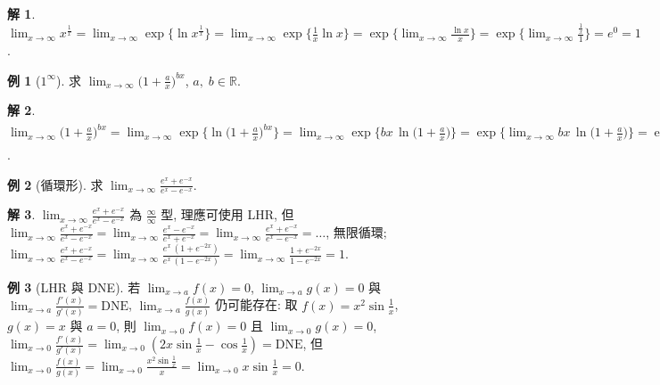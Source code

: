 \documentclass[12pt]{extarticle}
\newcommand{\ds}{\displaystyle}
\theoremstyle{definition}
\newtheorem*{ex}{例}
\newtheorem*{sol}{解}
\begin{document}
\begin{sol}
  $\ds\lim_{x\to\infty} x^{\frac{1}{x}} = \lim_{x\to\infty}\exp\big\{\ln x^{\frac{1}{x}}\big\} = \lim_{x\to\infty}\exp\Big\{\frac{1}{x}\ln x\Big\} = \exp\Big\{\lim_{x\to\infty}\frac{\ln x}{x}\Big\} = \exp\Big\{\lim_{x\to\infty}\frac{\frac{1}{x}}{1}\Big\} = e^0 = 1$.  
\end{sol}

\begin{ex}[$1^\infty$]
  求 $\ds\lim_{x\to\infty} \Big(1 + \frac{a}{x}\Big)^{bx}$, $a,\;b\in\mathbb{R}$. 
\end{ex}

\begin{sol}
  $\ds\lim_{x\to\infty} \Big(1 + \frac{a}{x}\Big)^{bx} = \lim_{x\to\infty} \exp\Big\{\ln\big(1 + \frac{a}{x}\big)^{bx}\Big\} = \lim_{x\to\infty} \exp\Big\{bx\,\ln\big(1 + \frac{a}{x}\big)\Big\} = \exp\Big\{\lim_{x\to\infty} bx\,\ln\big(1 + \frac{a}{x}\big)\Big\} = \exp\bigg\{b\lim_{x\to\infty}\frac{\ln(1 + \frac{a}{x})}{\frac{1}{x}}\bigg\} = \exp\bigg\{b\lim_{x\to\infty}\frac{\frac{1}{1 + \frac{a}{x}}\cdot\frac{-a}{x^2}}{\frac{-1}{x^2}}\bigg\} = \exp\bigg\{b\lim_{x\to\infty}\frac{a}{1 + \frac{a}{x}}\bigg\} = e^{ba}$. 
\end{sol}

\begin{ex}[循環形]
  求 $\ds\lim_{x\to\infty}\frac{e^x + e^{-x}}{e^x - e^{-x}}$. 
\end{ex}

\begin{sol}
  $\ds\lim_{x\to\infty}\frac{e^x + e^{-x}}{e^x - e^{-x}}$ 為 $\frac{\infty}{\infty}$ 型, 理應可使用 LHR, 但 $\ds\lim_{x\to\infty}\frac{e^x + e^{-x}}{e^x - e^{-x}} = \ds\lim_{x\to\infty}\frac{e^x - e^{-x}}{e^x + e^{-x}} = \lim_{x\to\infty}\frac{e^x + e^{-x}}{e^x - e^{-x}} = \ldots$, 無限循環; $\ds\lim_{x\to\infty}\frac{e^x + e^{-x}}{e^x - e^{-x}} = \lim_{x\to\infty}\frac{e^x\,(1 + e^{-2x})}{e^x\,(1 - e^{-2x})} = \lim_{x\to\infty}\frac{1 + e^{-2x}}{1 - e^{-2x}} = 1$. 
\end{sol}

\begin{ex}[LHR 與 DNE]
  若 $\ds\lim_{x\to a}f(x) = 0$, $\ds\lim_{x\to a}g(x) = 0$ 與 $\ds\lim_{x\to a}\frac{f'(x)}{g'(x)} = \text{DNE}$, $\ds\lim_{x\to a}\frac{f(x)}{g(x)}$ 仍可能存在: 取 $\ds f(x) = x^2\sin\frac{1}{x}$, $g(x)= x$ 與 $a = 0$, 則 $\ds\lim_{x\to 0} f(x) = 0$ 且 $\ds\lim_{x\to 0} g(x) = 0$, $\ds\lim_{x\to 0}\frac{f'(x)}{g'(x)} = \lim_{x\to 0}\left(2x\sin\frac{1}{x} -\cos\frac{1}{x}\right) = \text{DNE}$, 但 $\ds\lim_{x\to 0}\frac{f(x)}{g(x)} = \lim_{x\to 0}\frac{x^2\sin\frac{1}{x}}{x} = \lim_{x\to 0} x\sin\frac{1}{x}= 0$. 
\end{ex}
\end{document}
